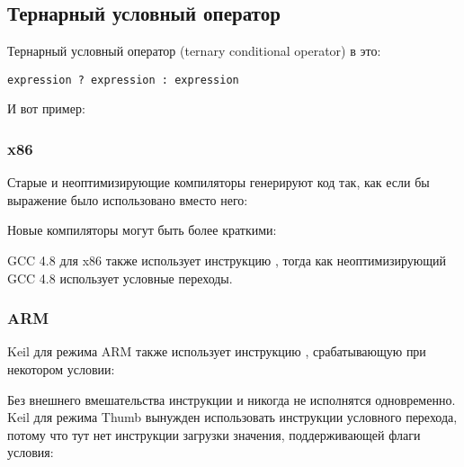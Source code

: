 \subsection{Тернарный условный оператор}
\label{chap:cond}

Тернарный условный оператор (ternary conditional operator) в \CCpp это:

\begin{lstlisting}
expression ? expression : expression
\end{lstlisting}

И вот пример:



\subsubsection{x86}

Старые и неоптимизирующие компиляторы генерируют код так, как если бы выражение  было использовано
вместо него:





Новые компиляторы могут быть более краткими:



\Optimizing GCC 4.8 для x86 также использует инструкцию ,
тогда как неоптимизирующий GCC 4.8 использует условные переходы.

\subsubsection{ARM}

\Optimizing Keil для режима ARM также использует инструкцию , срабатывающую при некотором
условии:



Без внешнего вмешательства инструкции  и  никогда не исполнятся одновременно.
\Optimizing Keil для режима Thumb вынужден использовать инструкции условного перехода, потому
что тут нет инструкции загрузки значения, поддерживающей флаги условия:


